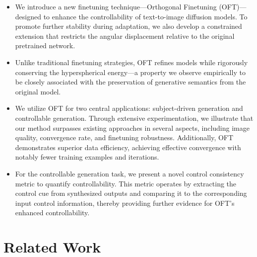 \begin{itemize}[leftmargin=*,nosep]

    \item We introduce a new finetuning technique—Orthogonal Finetuning (OFT)—designed to enhance the controllability of text-to-image diffusion models. To promote further stability during adaptation, we also develop a constrained extension that restricts the angular displacement relative to the original pretrained network.
    \item Unlike traditional finetuning strategies, OFT refines models while rigorously conserving the hyperspherical energy—a property we observe empirically to be closely associated with the preservation of generative semantics from the original model.
    \item We utilize OFT for two central applications: subject-driven generation and controllable generation. Through extensive experimentation, we illustrate that our method surpasses existing approaches in several aspects, including image quality, convergence rate, and finetuning robustness. Additionally, OFT demonstrates superior data efficiency, achieving effective convergence with notably fewer training examples and iterations.
    \item For the controllable generation task, we present a novel control consistency metric to quantify controllability. This metric operates by extracting the control cue from synthesized outputs and comparing it to the corresponding input control information, thereby providing further evidence for OFT's enhanced controllability.
\end{itemize}

\section{Related Work}

